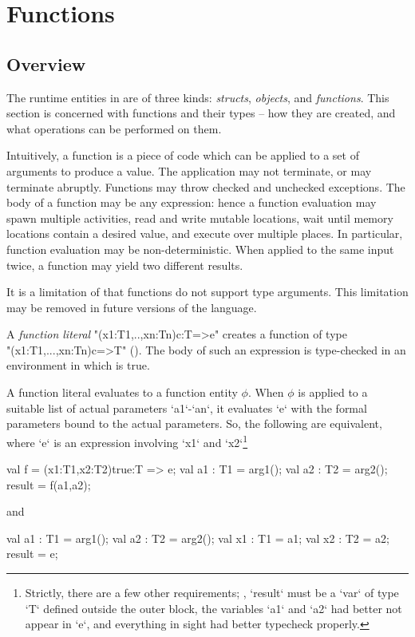 \chapter{Functions}
\label{Functions}
\label{functions}
\label{Closures}

\section{Overview}
The runtime entities in \Xten{} are of three kinds: \emph{structs},
\emph{objects}, and \emph{functions}. This section is concerned with
functions and their types -- how they are created, and what operations
can be performed on them.

Intuitively, a function is a piece of code which can be applied to a
set of arguments to produce a value. The application may not
terminate, or may terminate abruptly. Functions may throw checked and
unchecked exceptions. The body of a function may be any \Xten{}
expression: hence a function evaluation may spawn multiple activities,
read and write mutable locations, wait until memory locations contain
a desired value, and execute over multiple places. In particular,
function evaluation may be non-deterministic. When applied to the same
input twice, a function may yield two different results.

It is a limitation of \XtenCurrVer{} that functions do not support
type arguments. This limitation may be removed in future versions of
the language.

A \emph{function literal} \xcd"(x1:T1,..,xn:Tn){c}:T=>e" creates a function of
type\\ \xcd"(x1:T1,...,xn:Tn){c}=>T" (). The body 
of such an expression is type-checked in an environment in which  is
true. 

A function literal evaluates to a function entity {$\phi$}. When {$\phi$} is
applied to a suitable list of actual parameters \xcd`a1`-\xcd`an`, it
evaluates \xcd`e` with the formal parameters bound to the actual parameters.
So, the following are equivalent, where \xcd`e` is an expression involving
\xcd`x1` and \xcd`x2`\footnote{Strictly, there are a few other requirements;
  \eg, \xcd`result` must be a \xcd`var` of type \xcd`T` defined outside the
  outer block, the variables \xcd`a1` and \xcd`a2` had better not appear in
  \xcd`e`, and everything in sight had better typecheck properly.}
\begin{xten}
{
  val f = (x1:T1,x2:T2){true}:T => e;
  val a1 : T1 = arg1();
  val a2 : T2 = arg2();
  result = f(a1,a2);
}
\end{xten}
and 
\begin{xten}
{
  val a1 : T1 = arg1();
  val a2 : T2 = arg2();
  {
     val x1 : T1 = a1;
     val x2 : T2 = a2;
     result = e;
  }  
}
\end{xten}


